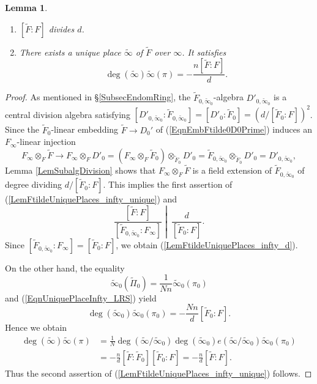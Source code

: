 \documentclass[10pt]{amsart}
\theoremstyle{plain}
\newtheorem{lem}[thm]{Lemma}
\theoremstyle{definition}
\begin{document}
\begin{lem}\label{LemFtildeUniquePlaces_infty}
	\begin{enumerate}
		\item\label{LemFtildeUniquePlaces_infty_d} $[\tilde{F}:F]$ divides $d$.
		\item\label{LemFtildeUniquePlaces_infty_unique} 
		There exists a unique place $\tilde{\infty}$ of $\tilde{F}$ over $\infty$. It satisfies
		\[
		\deg(\tilde{\infty})\tilde{\infty}(\pi)=-\frac{n[\tilde{F}:F]}{d}.
		\]
	\end{enumerate}
\end{lem}
\begin{proof}
	As mentioned in \S\ref{SubsecEndomRing}, the $\tilde{F}_{0,\tilde{\infty}_0}$-algebra $D'_{0,\tilde{\infty}_0}$ is a central division algebra
	satisfying $[D'_{0,\tilde{\infty}_0}:\tilde{F}_{0,\tilde{\infty}_0}]=[D'_0:\tilde{F}_0]=(d/[\tilde{F}_0:F])^2$.
	Since the $\tilde{F}_0$-linear embedding $\tilde{F}\to D_0'$ of (\ref{EqnEmbFtilde0D0Prime})
	induces an $F_\infty$-linear injection
	\[
	F_\infty\otimes_F \tilde{F}\to F_\infty\otimes_F D'_0=(F_\infty\otimes_F \tilde{F}_0)\otimes_{\tilde{F}_0} D'_0
	=\tilde{F}_{0,\tilde{\infty}_0}\otimes_{\tilde{F}_0} D'_0=D'_{0,\tilde{\infty}_0},
	\]
	Lemma \ref{LemSubalgDivision} shows that $F_\infty\otimes_F \tilde{F}$ is a field extension of $\tilde{F}_{0,\tilde{\infty}_0}$ of degree dividing 
	$d/[\tilde{F}_0:F]$.
	This implies the first assertion of (\ref{LemFtildeUniquePlaces_infty_unique}) and
	\[
	\left.\frac{[\tilde{F}:F]}{[\tilde{F}_{0,\tilde{\infty}_0}:F_\infty]} \middle|\  \frac{d}{[\tilde{F}_0:F]}\right..
	\]
	Since $[\tilde{F}_{0,\tilde{\infty}_0}:F_\infty]=[\tilde{F}_0:F]$, we obtain (\ref{LemFtildeUniquePlaces_infty_d}).
	
	On the other hand, the equality
	\[
	\tilde{\infty}_0(\tilde{\Pi}_0)=\frac{1}{N n}\tilde{\infty}_0(\pi_0)
	\] 
	and (\ref{EqnUniquePlaceInfty_LRS}) yield
	\[
	\deg(\tilde{\infty}_0)\tilde{\infty}_0(\pi_0)=-\frac{N n}{d}[\tilde{F}_0:F].
	\]
	Hence we obtain
	\[
	\begin{aligned}
		\deg(\tilde{\infty})\tilde{\infty}(\pi)&=\frac{1}{N}\deg(\tilde{\infty}/\tilde{\infty}_0)
		\deg(\tilde{\infty}_0)e(\tilde{\infty}/\tilde{\infty}_0)\tilde{\infty}_0(\pi_0)\\
		&=-\frac{n}{d}[\tilde{F}:\tilde{F}_0][\tilde{F}_0:F]=-\frac{n}{d}[\tilde{F}:F].
	\end{aligned}
	\]
	Thus the second assertion of (\ref{LemFtildeUniquePlaces_infty_unique}) follows.
\end{proof}
\end{document}
